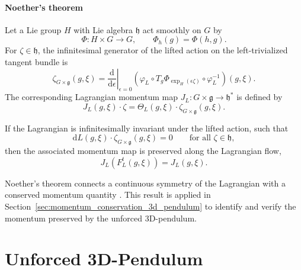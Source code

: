 \paragraph{Noether's theorem}
Let a Lie group $H$ with Lie algebra $\mathfrak h$ act smoothly on $G$ by
\begin{equation}
    \Phi:H\times G\rightarrow G,
    \qquad
    \Phi_h(g)=\Phi(h,g).
    \label{eq:symmetry_group_action}
\end{equation}
For $\zeta\in\mathfrak h$, the infinitesimal generator of the lifted action on the left-trivialized tangent bundle is
\begin{equation}
    \zeta_{G\times\mathfrak g}(g,\xi)
    =
    \left.\frac{\mathrm d}{\mathrm d\epsilon}\right|_{\epsilon=0}
    \left(
        \varphi_L
        \circ T_g\Phi_{\exp_H(\epsilon\zeta)}
        \circ\varphi_L^{-1}
    \right)(g,\xi).
    \label{eq:lifted_infinitesimal_generator}
\end{equation}
The corresponding Lagrangian momentum map $J_L:G\times\mathfrak g\rightarrow\mathfrak h^*$ is defined by
\begin{equation}
    J_L(g,\xi)\cdot\zeta
    =
    \Theta_L(g,\xi)\cdot
    \zeta_{G\times\mathfrak g}(g,\xi).
    \label{eq:continuous_lagrangian_momentum_map}
\end{equation}

\begin{theorem}
\label{thm:continuous_noether}
If the Lagrangian is infinitesimally invariant under the lifted action, such that
\begin{equation}
    \mathrm dL(g,\xi)\cdot
    \zeta_{G\times\mathfrak g}(g,\xi)=0
    \qquad
    \text{for all }\zeta\in\mathfrak h,
    \label{eq:infinitesimal_lagrangian_invariance}
\end{equation}
then the associated momentum map is preserved along the Lagrangian flow,
\begin{equation}
    J_L\!\left(F_L^t(g,\xi)\right)
    =
    J_L(g,\xi).
    \label{eq:continuous_noether_momentum_preservation}
\end{equation}
\end{theorem}

Noether's theorem connects a continuous symmetry of the Lagrangian with a conserved momentum quantity \cite{Lee2008,Marsden2001}. This result is applied in Section~\ref{sec:momentum_conservation_3d_pendulum} to identify and verify the momentum preserved by the unforced 3D-pendulum.


\section{Unforced 3D-Pendulum}
\label{section:continuous_3D_pendulum}

